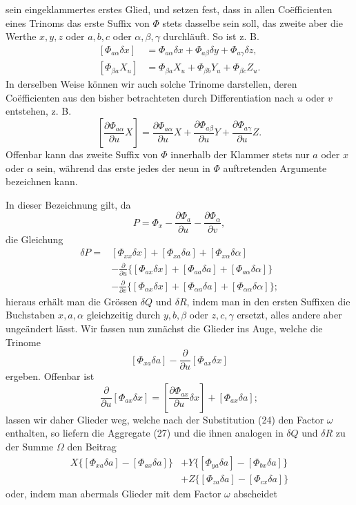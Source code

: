 \documentclass[11pt,a4paper,leqno]{article}
\begin{document}
sein eingeklammertes erstes Glied, und setzen fest, dass in allen
Coëfficienten eines Trinoms das erste Suffix von $\Phi$ stets dasselbe sein
soll, das zweite aber die Werthe $x,y,z$ oder $a,b,c$ oder
$\alpha,\beta,\gamma$ durchläuft. So ist z. B.
\[
\begin{aligned}
[\Phi_{a\alpha}\delta x]&=\Phi_{a\alpha}\delta x+\Phi_{a\beta}\delta y
+\Phi_{a\gamma}\delta z,\\
[\Phi_{\beta a}X_u]&=\Phi_{\beta a}X_u+\Phi_{\beta b}Y_u
+\Phi_{\beta c}Z_u.
\end{aligned}
\]
In derselben Weise können wir auch solche Trinome darstellen, deren
Coëfficienten aus den bisher betrachteten durch Differentiation nach $u$
oder $v$ entstehen, z. B.
\[
\left[\frac{\partial\Phi_{a\alpha}}{\partial u}X\right]
=\frac{\partial\Phi_{a\alpha}}{\partial u}X
+\frac{\partial\Phi_{a\beta}}{\partial u}Y
+\frac{\partial\Phi_{a\gamma}}{\partial u}Z.
\]
Offenbar kann das zweite Suffix von $\Phi$ innerhalb der Klammer stets nur
$a$ oder $x$ oder $\alpha$ sein, während das erste jedes der neun in $\Phi$
auftretenden Argumente bezeichnen kann.

In dieser Bezeichnung gilt, da
\[
P=\Phi_x-\frac{\partial\Phi_a}{\partial u}
-\frac{\partial\Phi_\alpha}{\partial v},
\]
die Gleichung
\[
\begin{aligned}
\delta P={}&[\Phi_{xx}\delta x]+[\Phi_{xa}\delta a]
+[\Phi_{x\alpha}\delta\alpha]\\
&-\frac{\partial}{\partial u}
\{[\Phi_{ax}\delta x]+[\Phi_{aa}\delta a]
+[\Phi_{a\alpha}\delta\alpha]\}\\
&-\frac{\partial}{\partial v}
\{[\Phi_{\alpha x}\delta x]+[\Phi_{\alpha a}\delta a]
+[\Phi_{\alpha\alpha}\delta\alpha]\};
\end{aligned}
\]
hieraus erhält man die Grössen $\delta Q$ und $\delta R$, indem man in den
ersten Suffixen die Buchstaben $x,a,\alpha$ gleichzeitig durch $y,b,\beta$
oder $z,c,\gamma$ ersetzt, alles andere aber ungeändert lässt. Wir fassen
nun zunächst die Glieder ins Auge, welche die Trinome
\begin{equation}\tag{27}
[\Phi_{xa}\delta a]-\frac{\partial}{\partial u}[\Phi_{ax}\delta x]
\end{equation}
ergeben. Offenbar ist
\[
\frac{\partial}{\partial u}[\Phi_{ax}\delta x]
=\left[\frac{\partial\Phi_{ax}}{\partial u}\delta x\right]
+[\Phi_{ax}\delta a];
\]
lassen wir daher Glieder weg, welche nach der Substitution (24) den Factor
$\omega$ enthalten, so liefern die Aggregate (27) und die ihnen analogen in
$\delta Q$ und $\delta R$ zu der Summe $\Omega$ den Beitrag
\[
\begin{aligned}
X\{[\Phi_{xa}\delta a]-[\Phi_{ax}\delta a]\}
&+Y\{[\Phi_{ya}\delta a]-[\Phi_{bx}\delta a]\}\\
&+Z\{[\Phi_{za}\delta a]-[\Phi_{cx}\delta a]\}
\end{aligned}
\]
oder, indem man abermals Glieder mit dem Factor $\omega$ abscheidet
\end{document}
